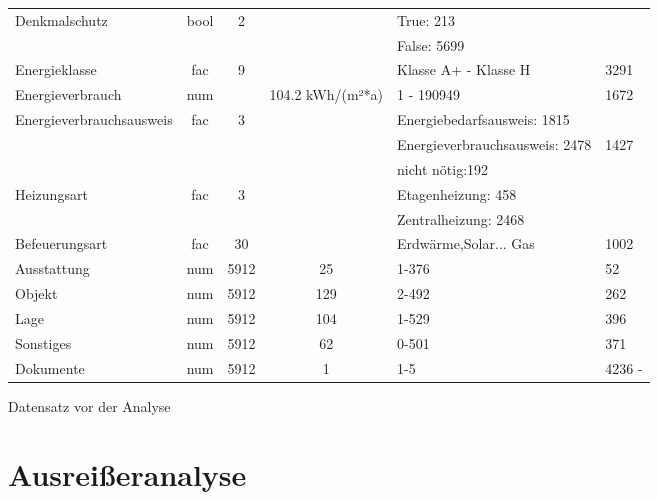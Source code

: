 \begin{landscape}
\begin{tabular}{|l||c|c|c|l|l|}
		Denkmalschutz   & bool & 2                   &	    			& True: 213                      &  \\ 
						&      &                     &    				& False: 5699                    &  \\ \hline
		Energieklasse   & fac  & 9                   &    				& Klasse A+ - Klasse H           & 3291   \\ \hline
		Energieverbrauch& num  &                     &	104.2  kWh/(m²*a)& 1 - 190949                    & 1672   \\ \hline
Energieverbrauchsausweis & fac  & 3                   &	                 & Energiebedarfsausweis: 1815   &     \\ 
						&      &                     &	                 & Energieverbrauchsausweis: 2478  &  1427   \\ 
						&      &                     &	                 & nicht nötig:192               &     \\ \hline
			Heizungsart & fac  & 3                   &	                 & Etagenheizung: 458            &      \\ 
						&      &                     &	                 & Zentralheizung: 2468          &      \\ \hline
		Befeuerungsart  & fac  & 30                  &	                 & Erdwärme,Solar... Gas         & 1002 \\ \hline
		Ausstattung     & num  & 5912                &	  25             & 1-376         		         &  52  \\ \hline
		Objekt          & num  & 5912                &	  129            & 2-492         		         &   262  \\ \hline
		Lage            & num  & 5912                &	  104            & 1-529         		         &   396  \\ \hline
		Sonstiges       & num  & 5912                &	  62             & 0-501         		         &   371  \\ \hline
		Dokumente       & num  & 5912                &	  1             & 1-5           		         & 4236  -  \\ \hline
	\end{tabular}
\caption{Datensatz vor der Analyse}
\label{tbl: vor der Analyse}
\end{landscape}
\section{Ausreißeranalyse}\label{sec:Ausreißeranalyse}

